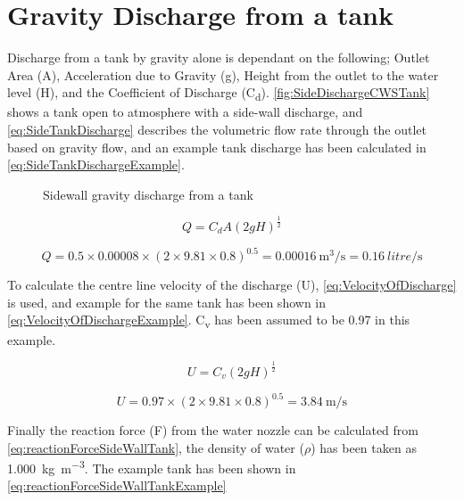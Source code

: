 

\section{Gravity Discharge from a tank}

Discharge from a tank by gravity alone is dependant on the following; Outlet Area (A), Acceleration due to Gravity (g), Height from the outlet to the water level (H), and the Coefficient of Discharge (C\textsubscript{d}).  \autoref{fig:SideDischargeCWSTank} shows a tank open to atmosphere with a side-wall discharge, and \autoref{eq:SideTankDischarge} describes the volumetric flow rate through the outlet based on gravity flow, and an example tank discharge has been calculated in \autoref{eq:SideTankDischargeExample}.

\begin{figure}
\centering

\caption{Sidewall gravity discharge from a tank}
\label{fig:SideDischargeCWSTank}
\end{figure}

\begin{equation}\label{eq:SideTankDischarge}
Q = C_{d} A (2gH)^{\frac{1}{2}}
\end{equation}

\begin{equation}\label{eq:SideTankDischargeExample}
Q = 0.5 \times 0.00008 \times (2\times9.81\times0.8)^{0.5} = 0.00016~\si{\cubic\metre\per\second} = 0.16~\si{litre\per\second}
\end{equation}

To calculate the centre line velocity of the discharge (U), \autoref{eq:VelocityOfDischarge} is used, and example for the same tank has been shown in \autoref{eq:VelocityOfDischargeExample}.  C\textsubscript{v} has been assumed to be 0.97 in this example.

\begin{equation}\label{eq:VelocityOfDischarge}
U = C_v (2gH)^{\frac{1}{2}}
\end{equation}

\begin{equation}\label{eq:VelocityOfDischargeExample}
U = 0.97 \times (2 \times 9.81 \times 0.8)^{0.5} = 3.84~\si{\metre\per\second}
\end{equation}

Finally the reaction force (F) from the water nozzle can be calculated from \autoref{eq:reactionForceSideWallTank}, the density of water ($\rho$) has been taken as \SI{1,000}{\kilo\gram\per\cubic\metre}.  The example tank has been shown in \autoref{eq:reactionForceSideWallTankExample}

